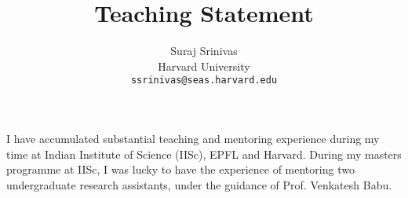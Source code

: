 \documentclass{article}
\title{Teaching Statement}
\author{Suraj Srinivas \\
    {Harvard University}\\
    \small{\texttt{ssrinivas@seas.harvard.edu}}
	}
\date{}
\begin{document}
\maketitle

I have accumulated substantial teaching and mentoring experience during my time at Indian Institute of Science (IISc), 
EPFL and Harvard. During my masters programme at IISc, I was lucky to have the experience of mentoring two undergraduate 
research assistants, under the guidance of Prof. Venkatesh Babu. 
\end{document}
